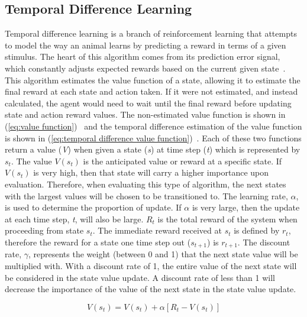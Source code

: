 \documentclass[12pt,american]{report}
\begin{document}
\subsection{Temporal Difference Learning}
Temporal difference learning is a branch of reinforcement learning that attempts to model the way an animal learns by predicting a reward in terms of a given stimulus. The heart of this algorithm comes from its prediction error signal, which constantly adjusts expected rewards based on the current given state~\cite{o2003temporal}. This algorithm estimates the value function of a state, allowing it to estimate the final reward at each state and action taken.  If it were not estimated, and instead calculated, the agent would need to wait until the final reward before updating state and action reward values. The non-estimated value function is shown in (\ref{eq:value function})~\cite{Eden} and the temporal difference estimation of the value function is shown in (\ref{eq:temporal difference value function})~\cite{Eden}. Each of these two functions return a value (\textit{V}) when given a state (\textit{s}) at time step (\textit{t}) which is represented by \textit{$s_t$}. The value \textit{$V(s_t)$} is the anticipated value or reward at a specific state.  If \textit{$V(s_t)$} is very high, then that state will carry a higher importance upon evaluation. Therefore, when evaluating this type of algorithm, the next states with the largest values will be chosen to be transitioned to. The learning rate, \textit{$\alpha$}, is used to determine the proportion of update.  If \textit{$\alpha$} is very large, then the update at each time step, \textit{t}, will also be large.  \textit{$R_t$} is the total reward of the system when proceeding from state \textit{$s_t$}. The immediate reward received at \textit{$s_t$} is defined by \textit{$r_t$}, therefore the reward for a state one time step out (\textit{$s_{t+1}$}) is \textit{$r_{t+1}$}. The discount rate, \textit{$\gamma$}, represents the weight (between 0 and 1) that the next state value will be multiplied with.  With a discount rate of 1, the entire value of the next state will be considered in the state value update. A discount rate of less than 1 will decrease the importance of the value of the next state in the state value update.

        \begin{equation}
            \label{eq:value function}
            V(s_{t}) = V(s_{t}) + \alpha[R_{t}-V(s_{t})]
        \end{equation}
\end{document}
